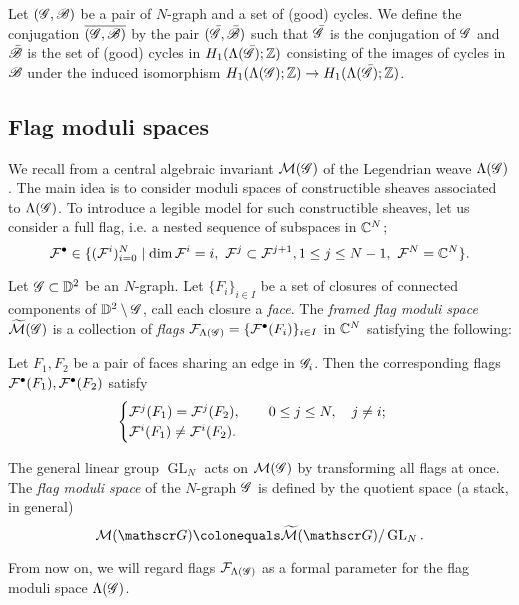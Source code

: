 Let $(\mathscr{G}, \mathscr{B})$ be a pair of $N$-graph and a set of (good) cycles.
We define the conjugation $\overline{(\mathscr{G}, \mathscr{B})}$ by the pair $(\bar{\mathscr{G}},\bar{\mathscr{B}})$ such that $\bar{\mathscr{G}}$ is the conjugation of $\mathscr{G}$ and $\bar{\mathscr{B}}$ is the set of (good) cycles in $H_1(\Lambda(\bar{\mathscr{G}});\mathbb{Z})$ consisting of the images of cycles in $\mathscr{B}$ under the induced isomorphism $H_1(\Lambda(\mathscr{G});\mathbb{Z})\to H_1(\Lambda(\bar{\mathscr{G}});\mathbb{Z})$. 

\subsection{Flag moduli spaces}\label{sec:flag moduli spaces}
We recall from \cite{CZ2020} a central algebraic invariant $\mathcal{M}(\mathscr{G})$ of the Legendrian weave $\Lambda(\mathscr{G})$.
The main idea is to consider moduli spaces of constructible sheaves associated to $\Lambda(\mathscr{G})$.
To introduce a legible model for such constructible sheaves, let us consider a full flag, i.e. a nested sequence of subspaces in $\mathbb{C}^N$;
\[
\mathcal{F}^\bullet \in \{(\mathcal{F}^i)_{i=0}^N \mid \dim \mathcal{F}^i=i,\  \mathcal{F}^j\subset \mathcal{F}^{j+1}, 1\leq j\leq N-1,\  \mathcal{F}^N=\mathbb{C}^N \}.
\]
\begin{definition}\cite{CZ2020}\label{def:flag moduli space}
Let $\mathscr{G}\subset \mathbb{D}^2$ be an $N$-graph. Let $\{F_i\}_{i\in I}$ be a set of closures of connected components of $\mathbb{D}^2\setminus \mathscr{G}$, call each closure a \emph{face}. 
The \emph{framed flag moduli space} $\widetilde {\mathcal{M}}(\mathscr{G})$ is a collection of \emph{flags} $\mathcal{F}_{\Lambda(\mathscr{G})}=\{\mathcal{F}^\bullet(F_i)\}_{i\in I}$ in $\mathbb{C}^N$ satisfying the following: 

Let $F_1,F_2$ be a pair of faces sharing an edge in $\mathscr{G}_i$. Then the corresponding flags $\mathcal{F}^\bullet(F_1),\mathcal{F}^\bullet(F_2)$ satisfy
\begin{align}\label{equation:flag conditions}
\begin{cases}
\mathcal{F}^j(F_1)=\mathcal{F}^j(F_2), \qquad 0\leq j \leq N, \quad j\neq i;\\
\mathcal{F}^i(F_1)\neq \mathcal{F}^i(F_2).
\end{cases}
\end{align}

The general linear group $\operatorname{GL}_N$ acts on $\mathcal{M}(\mathscr{G})$ by transforming all flags at once. The \emph{flag moduli space} of the $N$-graph $\mathscr{G}$ is defined by the quotient space (a stack, in general)
\[
\cM(\ngraph)\colonequals\widetilde{\cM}(\ngraph)/\operatorname{GL}_N.
\] 
\end{definition}
From now on, we will regard flags $\mathcal{F}_{\Lambda(\mathscr{G})}$ as a formal parameter for the flag moduli space $\Lambda(\mathscr{G})$.

